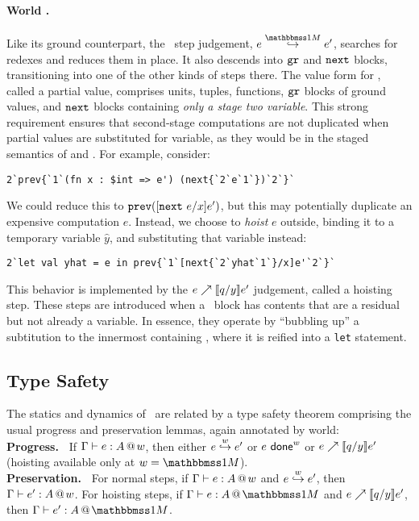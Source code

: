 \paragraph{World \bbonem.}
Like its ground counterpart, the \bbonem\ step judgement, $\stepmix e {e'}$, searches for redexes and reduces them in place.
It also descends into ${\tt gr}$ and ${\tt next}$ blocks, transitioning into one of the other kinds of steps there. 
The value form for \bbonem, called a partial value, comprises units, tuples, functions, ${\tt gr}$ blocks of ground values, and ${\tt next}$ blocks containing \emph{only a stage two variable}.
This strong requirement ensures that second-stage computations are not duplicated when partial values are substituted for variable,
as they would be in the staged semantics of \cite{taha-thesis-99} and \cite{davies96}.
For example, consider:
\begin{lstlisting} 
2`prev{`1`(fn x : $int => e') (next{`2`e`1`})`2`}`
\end{lstlisting}
We could reduce this to ${\tt prev}([{\tt next}~e/x]e')$, but this may potentially duplicate an
expensive computation $e$. Instead, we choose to \emph{hoist} $e$ outside, binding it
to a temporary variable $\hat{y}$, and substituting that variable instead:
\begin{lstlisting} 
2`let val yhat = e in prev{`1`[next{`2`yhat`1`}/x]e'`2`}`
\end{lstlisting}
This behavior is implemented by the ${e}\nearrow \llbracket q/y \rrbracket{e'}$ judgement, called a hoisting step.
These steps are introduced when a \next\ block has contents that are a residual but not already a variable.
In essence, they operate by ``bubbling up'' a subtitution to the innermost containing \prev,
where it is reified into a {\tt let} statement.

\subsection{Type Safety}

The statics and dynamics of \lang\ are related by a type safety theorem
comprising the usual progress and preservation lemmas, again annotated by world:
\\{\bf Progress.~} If $\Gamma{} \vdash {e}:{A}~\hspace{-0.15em}\text{@}\hspace{-0.2em}~w$, then either 
${e}\overset{w}\hookrightarrow {e'}$ or $e \ \mathsf{done}^{w}$ or ${e}\nearrow \llbracket q/y \rrbracket{e'}$ (hoisting available only at $w = \bbonem$).
\\{\bf Preservation.~} For normal steps, if $\Gamma{} \vdash {e}:{A}~\hspace{-0.15em}\text{@}\hspace{-0.2em}~w$ and ${e}\overset{w}\hookrightarrow {e'}$, then $\Gamma{} \vdash {e'}:{A}~\hspace{-0.15em}\text{@}\hspace{-0.2em}~w$. 
For hoisting steps, if $\typesone e A$ and ${e}\nearrow \llbracket q/y \rrbracket{e'}$, then $\typesone {e'} A$.

